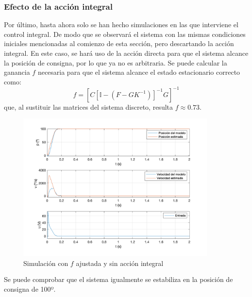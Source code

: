 \documentclass[a4paper, 12pt]{article}
\begin{document}
\subsubsection{Efecto de la acción integral}
Por último, hasta ahora solo se han hecho simulaciones en las que interviene el control integral. De modo que se observará el sistema con las mismas condiciones iniciales mencionadas al comienzo de esta sección, pero descartando la acción integral. En este caso, se hará uso de la acción directa para que el sistema alcance la posición de consigna, por lo que ya no es arbitraria.
Se puede calcular la ganancia $f$ necesaria para que el sistema alcance el estado estacionario correcto como:
\begin{equation}
	f = \left[C[\mathbb{I} - (F - GK^{-1})]^{-1} G \right]^{-1} 
\end{equation}
que, al sustituir las matrices del sistema discreto, resulta $f \approx 0.73$.
\begin{figure}[H]
	\centering
	\includegraphics*[height = 7.5cm]{figs/p5/noai}

	\caption{Simulación con $f$ ajustada y sin acción integral} 
\end{figure}
Se puede comprobar que el sistema igualmente se estabiliza en la posición de consigna de 100º. 
\end{document}
